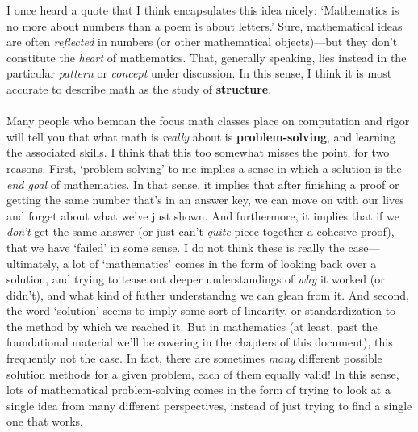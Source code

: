 \documentclass[10pt]{article}
\theoremstyle{definition}
\begin{document}
I once heard a quote that I think encapsulates this idea nicely: `Mathematics is no more about numbers than a poem is about letters.'  Sure, mathematical ideas are often \emph{reflected} in numbers (or other mathematical objects)---but they don't constitute the \emph{heart} of mathematics.  That, generally speaking, lies instead in the particular \emph{pattern} or \emph{concept} under discussion.  In this sense, I think it is most accurate to describe math as the study of \textbf{structure}.  \\~\\
Many people who bemoan the focus math classes place on computation and rigor will tell you that what math is \emph{really} about is \textbf{problem-solving}, and learning the associated skills.  I think that this too somewhat misses the point, for two reasons.  First, `problem-solving' to me implies a sense in which a solution is the \emph{end goal} of mathematics.  In that sense, it implies that after finishing a proof or getting the same number that's in an answer key, we can move on with our lives and forget about what we've just shown.  And furthermore, it implies that if we \emph{don't} get the same answer (or just can't \emph{quite} piece together a cohesive proof), that we have `failed' in some sense.  I do not think these is really the case---ultimately, a lot of `mathematics' comes in the form of looking back over a solution, and trying to tease out deeper understandings of \emph{why} it worked (or didn't), and what kind of futher understandng we can glean from it.  And second, the word `solution' seems to imply some sort of linearity, or standardization to the method by which we reached it.  But in mathematics (at least, past the foundational material we'll be covering in the chapters of this document), this frequently not the case.  In fact, there are sometimes \emph{many} different possible solution methods for a given problem, each of them equally valid!  In this sense, lots of mathematical problem-solving comes in the form of trying to look at a single idea from many different perspectives, instead of just trying to find a single one that works.  \\~\\
\end{document}

